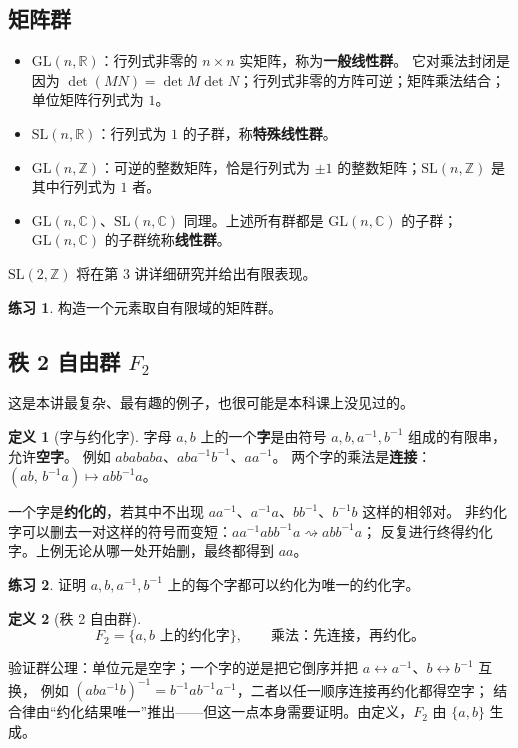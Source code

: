 \documentclass[11pt,a4paper]{article}
\theoremstyle{definition}
\newtheorem{definition}{定义}[section]
\newtheorem{exercise}{练习}
\theoremstyle{plain}
\theoremstyle{remark}
\newcommand{\Z}{\mathbb{Z}}
\newcommand{\R}{\mathbb{R}}
\newcommand{\C}{\mathbb{C}}
\newcommand{\GL}{\mathrm{GL}}
\newcommand{\SL}{\mathrm{SL}}
\begin{document}
\subsection{矩阵群}

\begin{itemize}
  \item $\GL(n,\R)$：行列式非零的 $n\times n$ 实矩阵，称为\textbf{一般线性群}。
        它对乘法封闭是因为 $\det(MN)=\det M\det N$；行列式非零的方阵可逆；矩阵乘法结合；单位矩阵行列式为 $1$。
  \item $\SL(n,\R)$：行列式为 $1$ 的子群，称\textbf{特殊线性群}。
  \item $\GL(n,\Z)$：可逆的整数矩阵，恰是行列式为 $\pm1$ 的整数矩阵；$\SL(n,\Z)$ 是其中行列式为 $1$ 者。
  \item $\GL(n,\C)$、$\SL(n,\C)$ 同理。上述所有群都是 $\GL(n,\C)$ 的子群；$\GL(n,\C)$ 的子群统称\textbf{线性群}。
\end{itemize}
$\SL(2,\Z)$ 将在第 3 讲详细研究并给出有限表现。

\begin{exercise}
构造一个元素取自有限域的矩阵群。
\end{exercise}

\subsection{秩 2 自由群 $F_2$}

这是本讲最复杂、最有趣的例子，也很可能是本科课上没见过的。

\begin{definition}[字与约化字]
字母 $a,b$ 上的一个\textbf{字}是由符号 $a,b,a^{-1},b^{-1}$ 组成的有限串，允许\textbf{空字}。
例如 $abababa$、$aba^{-1}b^{-1}$、$aa^{-1}$。
两个字的乘法是\textbf{连接}：$(ab,\,b^{-1}a)\mapsto abb^{-1}a$。

一个字是\textbf{约化的}，若其中不出现 $aa^{-1}$、$a^{-1}a$、$bb^{-1}$、$b^{-1}b$ 这样的相邻对。
非约化字可以删去一对这样的符号而变短：$aa^{-1}abb^{-1}a\rightsquigarrow abb^{-1}a$；
反复进行终得约化字。上例无论从哪一处开始删，最终都得到 $aa$。
\end{definition}

\begin{exercise}
证明 $a,b,a^{-1},b^{-1}$ 上的每个字都可以约化为唯一的约化字。
\end{exercise}

\begin{definition}[秩 2 自由群]
\[
  F_2=\{a,b\text{ 上的约化字}\},\qquad \text{乘法：先连接，再约化。}
\]
\end{definition}
验证群公理：单位元是空字；一个字的逆是把它倒序并把 $a\leftrightarrow a^{-1}$、$b\leftrightarrow b^{-1}$ 互换，
例如 $(aba^{-1}b)^{-1}=b^{-1}ab^{-1}a^{-1}$，二者以任一顺序连接再约化都得空字；
结合律由“约化结果唯一”推出——但这一点本身需要证明。由定义，$F_2$ 由 $\{a,b\}$ 生成。
\end{document}
